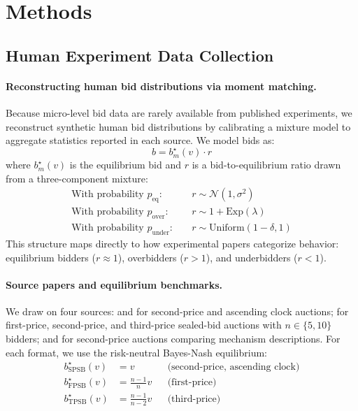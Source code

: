 
\section{Methods}\label{sec:general_method}
\subsection{Human Experiment Data Collection}

\paragraph{Reconstructing human bid distributions via moment matching.}
Because micro-level bid data are rarely available from published experiments, we reconstruct synthetic human bid distributions by calibrating a mixture model to aggregate statistics
reported in each source. We model bids as:
\[
b = b^\star_m(v) \cdot r
\]
where $b^\star_m(v)$ is the equilibrium bid and $r$ is a bid-to-equilibrium ratio drawn from a three-component mixture:
\begin{align*}
\text{With probability } p_{\text{eq}}: \quad & r \sim \mathcal{N}(1, \sigma^2) \\
\text{With probability } p_{\text{over}}: \quad & r \sim 1 + \text{Exp}(\lambda) \\
\text{With probability } p_{\text{under}}: \quad & r \sim \text{Uniform}(1-\delta, 1)
\end{align*}
This structure maps directly to how experimental papers categorize behavior: equilibrium bidders ($r \approx 1$), overbidders ($r > 1$), and underbidders ($r < 1$).

\paragraph{Source papers and equilibrium benchmarks.}
We draw on four sources: \citet{li2017obviously} and \citet{breitmoser2022obviousness} for second-price and ascending clock auctions; \citet{kagel1993independent} for first-price,
second-price, and third-price sealed-bid auctions with $n \in \{5, 10\}$ bidders; and \citet{gonczarowski2023strategyproofness} for second-price auctions comparing mechanism
descriptions. For each format, we use the risk-neutral Bayes-Nash equilibrium:
\begin{align*}
b^\star_{\text{SPSB}}(v) &= v & &\text{(second-price, ascending clock)} \\
b^\star_{\text{FPSB}}(v) &= \tfrac{n-1}{n} v & &\text{(first-price)} \\
b^\star_{\text{TPSB}}(v) &= \tfrac{n-1}{n-2} v & &\text{(third-price)}
\end{align*}

